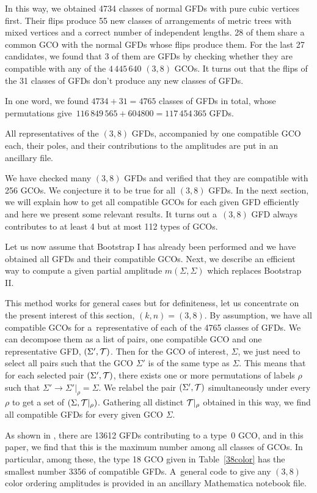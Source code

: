 \documentclass[pdftex]{sigma}
\theoremstyle{definition}
\numberwithin{equation}{section}
\begin{document}
In this way, we obtained 4734 classes of normal GFDs with pure cubic vertices first. Their flips produce 55 new classes of arrangements of metric trees with mixed vertices and a correct number of independent lengths. 28 of them share a common GCO with the normal GFDs whose flips produce them. For the last 27 candidates, we found that 3 of them are GFDs by checking whether they are compatible with any of the $4\, 445\, 640$ $(3,8)$ GCOs.
It turns out that the flips of the 31 classes of GFDs don't produce any new classes of GFDs.


In one word, we found $4734+31= 4765$ classes of GFDs in total, whose permutations give~${116\,849\,565+ 604800 = 117\,454\,365}$ GFDs.

All representatives of the $(3,8)$ GFDs, accompanied by one compatible GCO each, their poles, and their contributions to the amplitudes are put in an ancillary file.

We have checked many $(3,8)$ GFDs and verified that they are compatible with 256 GCOs. We conjecture it to be true for all $(3,8)$ GFDs.
In the next section, we will explain how to get all compatible GCOs for each given GFD efficiently and here we present some relevant results. It turns out a~$(3,8)$ GFD always contributes to at least 4 but at most 112 types of GCOs.

Let us now assume that Bootstrap I has already been performed and we have obtained all GFDs and their compatible GCOs. Next, we describe an efficient way to compute a given partial amplitude $m(\Sigma,\Sigma)$ which replaces Bootstrap II.

This method works for general cases but for definiteness, let us concentrate on the present interest of this section, $(k,n)=(3,8)$. By assumption, we have all compatible GCOs for a~representative of each of the 4765 classes of GFDs. We can decompose them as a list of pairs, one compatible GCO and one representative GFD, $(\Sigma',{\cal T})$. Then for the GCO of interest, $\Sigma$, we just need to select all pairs such that the GCO $\Sigma'$ is of the same type as $\Sigma$. This means that for each selected pair $(\Sigma',{\cal T})$, there exists one or more permutations of labels $\rho$ such that $\Sigma'\to \Sigma'|_{\rho}= \Sigma$. We relabel the pair $(\Sigma',{\cal T})$ simultaneously under every $\rho$ to get a set of $(\Sigma, {\cal T}|_{\rho})$. Gathering all distinct ${\cal T}|_{\rho}$ obtained in this way, we find all compatible GFDs for every given GCO $\Sigma$.

As shown in \cite{Cachazo:2019xjx}, there are 13612 GFDs contributing to a type~0 GCO, and in this paper, we find that this is the maximum number among all classes of GCOs. In particular, among these, the type 18 GCO given in Table~\ref{38color} has the smallest number 3356 of compatible GFDs. A~general code to give any $(3,8)$ color ordering amplitudes is provided in an ancillary Mathematica notebook file.
\end{document}
